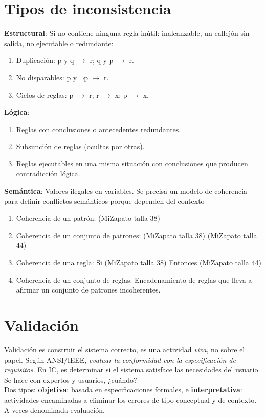 \documentclass[12pt]{article}
\begin{document}
\section{Tipos de inconsistencia}
\textbf{Estructural}: Si no contiene ninguna regla inútil: inalcanzable, un callejón sin salida, no ejecutable o redundante:
\begin{enumerate}
\item Duplicación: p y q $\rightarrow$ r; q y p $\rightarrow$ r.
\item No disparables: p y $\neg$p $\rightarrow$ r.
\item Ciclos de reglas: p $\rightarrow$ r; r $\rightarrow$ x; p $\rightarrow$ x.
\end{enumerate}
\textbf{Lógica}:
\begin{enumerate}
\item Reglas con conclusiones o antecedentes redundantes.
\item Subsunción de reglas (ocultas por otras).
\item Reglas ejecutables en una misma situación con conclusiones que producen contradicción lógica.
\end{enumerate}
\textbf{Semántica}: Valores ilegales en variables. Se precisa un modelo de coherencia para definir conflictos semánticos porque dependen del contexto
\begin{enumerate}
\item Coherencia de un patrón: (MiZapato talla 38)
\item Coherencia de un conjunto de patrones: (MiZapato talla 38) (MiZapato talla 44)
\item Coherencia de una regla: Si (MiZapato talla 38) Entonces (MiZapato talla 44)
\item Coherencia de un conjunto de reglas: Encadenamiento de reglas que lleva a afirmar un conjunto de patrones incoherentes.
\end{enumerate}

\section{Validación}
Validación es construir el sistema correcto, es una actividad \textit{viva}, no sobre el papel. Según ANSI/IEEE, \textit{evaluar la conformidad con la especificación de requisitos}. En IC, es determinar si el sistema satisface las necesidades del usuario. Se hace con expertos y usuarios, ¿cuándo?\\
Dos tipos: \textbf{objetiva}: basada en especificaciones formales, e \textbf{interpretativa}: actividades encaminadas a eliminar los errores de tipo conceptual y de contexto. A veces denominada evaluación.\\
\end{document}
